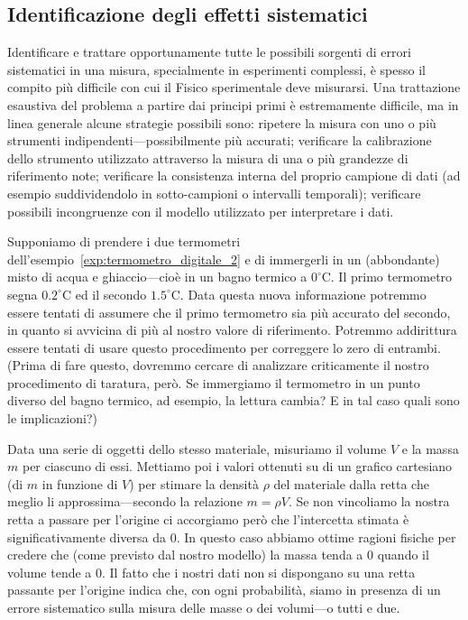 \subsection{Identificazione degli effetti sistematici}

Identificare e trattare opportunamente tutte le possibili sorgenti di errori
sistematici in una misura, specialmente in esperimenti complessi, è spesso
il compito più difficile con cui il Fisico sperimentale deve misurarsi.
Una trattazione esaustiva del problema a partire dai principi primi è
estremamente difficile, ma in linea generale alcune strategie possibili sono:
ripetere la misura con uno o più strumenti indipendenti---possibilmente
più accurati; verificare la calibrazione dello strumento utilizzato
attraverso la misura di una o più grandezze di riferimento note;
verificare la consistenza interna del proprio campione di dati (ad esempio
suddividendolo in sotto-campioni o intervalli temporali); verificare possibili
incongruenze con il modello utilizzato per interpretare i dati.

\begin{examplebox}
  \begin{example}
    Supponiamo di prendere i due termometri
    dell'esempio~\ref{exp:termometro_digitale_2} e di immergerli in un
    (abbondante) misto di acqua e ghiaccio---cioè in un bagno termico a
    $0^\circ$C. Il primo termometro segna $0.2^\circ$C ed il secondo $1.5^\circ$C.
    Data questa nuova informazione potremmo essere tentati di assumere che il
    primo termometro sia più accurato del secondo, in quanto si avvicina
    di più al nostro valore di riferimento. Potremmo addirittura essere
    tentati di usare questo procedimento per correggere lo zero
    di entrambi.
    (Prima di fare questo, dovremmo cercare di analizzare criticamente il
    nostro procedimento di taratura, però. Se immergiamo il termometro in
    un punto diverso del bagno termico, ad esempio, la lettura cambia? E in tal
    caso quali sono le implicazioni?)
  \end{example}

  \begin{example}
    Data una serie di oggetti dello stesso materiale, misuriamo il volume
    $V$ e la massa $m$ per ciascuno di essi. Mettiamo poi i valori
    ottenuti su di un grafico cartesiano (di $m$ in funzione di $V$) per
    stimare la densità $\rho$ del materiale dalla retta che meglio li
    approssima---secondo la relazione $m = \rho V$.
    Se non vincoliamo la nostra retta a passare per l'origine ci accorgiamo
    però che l'intercetta stimata è significativamente diversa da $0$.
    In questo caso abbiamo ottime ragioni fisiche per credere che (come
    previsto dal nostro modello) la massa tenda a $0$ quando il volume tende
    a $0$. Il fatto che i nostri dati non si dispongano su una retta passante
    per l'origine indica che, con ogni probabilità, siamo in presenza di
    un errore sistematico sulla misura delle masse o dei volumi---o tutti e due.
  \end{example}
\end{examplebox}



